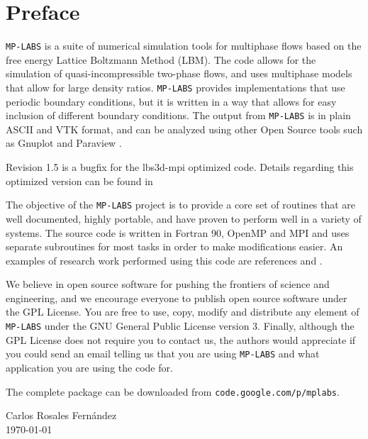 \documentclass[12pt]{report}
\begin{document}
\section*{Preface}\noindent \verb+MP-LABS+ is a suite of numerical simulation tools for multiphase flows based on the free energy Lattice Boltzmann Method (LBM). The code allows for the simulation of quasi-incompressible two-phase flows, and uses multiphase models that allow for large density ratios. \verb+MP-LABS+ provides implementations that use periodic boundary conditions, but it is written in a way that allows for easy inclusion of different boundary conditions. The output from \verb+MP-LABS+ is in plain ASCII and VTK format, and can be analyzed using other Open Source tools such as Gnuplot \cite{gnuplot} and Paraview \cite{paraview}.

\noindent Revision 1.5 is a bugfix for the lbs3d-mpi optimized code. Details regarding this optimized version can be found in \cite{Rosales2013}

\noindent The objective of the \verb+MP-LABS+ project is to provide a core set of routines that are well documented, highly portable, and have proven to perform well in a variety of systems. The source code is written in Fortran 90, OpenMP  and MPI and uses separate subroutines for most tasks in order to make modifications easier. An examples of research work performed using this code are references \cite{Rosales2007} and \cite{Rosales2010}.

\noindent We believe in open source software for pushing the frontiers of science and engineering, and we encourage everyone to publish open source software under the GPL License. You are free to use, copy, modify and distribute any element of \verb+MP-LABS+ under the GNU General Public License version 3. Finally, although the GPL License does not require you to contact us, the authors would appreciate if you could send an email telling us that you are using \verb+MP-LABS+ and what application you are using the code for.

\noindent The complete package can be downloaded from \verb+code.google.com/p/mplabs+.

\vspace{1cm}
	Carlos Rosales Fern\'andez\\
	\today

\pagebreak
\section*{}
\pagebreak
\end{document}

